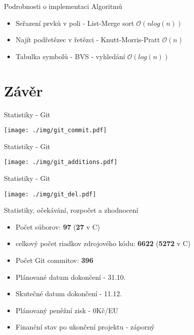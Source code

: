 \documentclass[13pt]{beamer}
\begin{document}
\begin{frame}{Podrobnosti o implementaci Algoritmů}

  \begin{itemize}
    \item Seřazení prvků v poli - List-Merge sort $\mathcal{O}(n log(n))$
    \item Najít podřetězec v řetězci - Knutt-Morris-Pratt $\mathcal{O}(n)$
    \item Tabulka symbolů - BVS - vyhledání $\mathcal{O}(log (n))$
  \end{itemize}
\end{frame}


\section{Závěr}
\begin{frame}{Statistiky - Git}
  \begin{center}
    \texttt{[image: ./img/git\_commit.pdf]}
  \end{center}
\end{frame}

\begin{frame}{Statistiky - Git}
  \begin{center}
    \texttt{[image: ./img/git\_additions.pdf]}
  \end{center}
\end{frame}

\begin{frame}{Statistiky - Git}
  \begin{center}
    \texttt{[image: ./img/git\_del.pdf]}
  \end{center}
\end{frame}

\begin{frame}{Statistiky, očekávání, rozpočet a zhodnocení}
\begin{itemize}
\item Počet súborov: \textbf{97} (\textbf{27} v C)
\item celkový počet riadkov zdrojového kódu: \textbf{6622} (\textbf{5272} v C)
\item Počet Git commitov: \textbf{396}
\end{itemize}

\begin{itemize}
\item Plánované datum dokončení - 31.10.
\item Skutečné datum dokončení - 11.12.
\item Plánovaný peněžní zisk - 0Kč/EU
\item Finanční stav po ukončení projektu - záporný
\end{itemize}

\end{frame}
\end{document}
